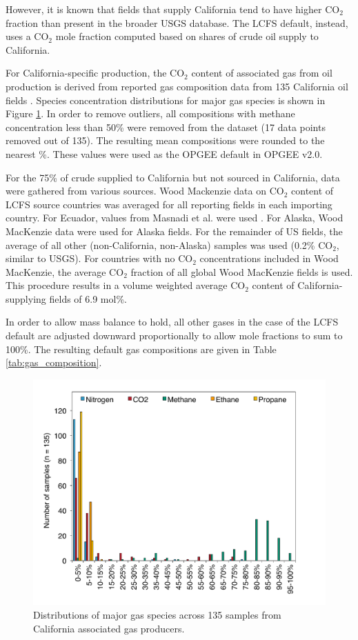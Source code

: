 \documentclass[11pt]{report}
\begin{document}
However, it is known that fields that supply California tend to have higher CO$_2$ fraction than present in the broader USGS database. The LCFS default, instead, uses a CO$_2$ mole fraction computed based on shares of crude oil supply to California. 

For California-specific production, the CO$_2$ content of associated gas from oil production is derived from reported gas composition data from 135 California oil fields \cite{Lee2011}. Species concentration distributions for major gas species is shown in Figure \ref{fig:gas_comp_major}. In order to remove outliers, all compositions with methane concentration less than 50\% were removed from the dataset (17 data points removed out of 135). The resulting mean compositions were rounded to the nearest \%. These values were used as the OPGEE default in OPGEE v2.0.

For the 75\% of crude supplied to California but not sourced in California, data were gathered from various sources. Wood Mackenzie data on CO$_2$ content of LCFS source countries was averaged for all reporting fields in each importing country.  For Ecuador, values from Masnadi et al. were used \cite{Masnadi2018}. For Alaska, Wood MacKenzie data were used for Alaska fields. For the remainder of US fields, the average of all other (non-California, non-Alaska) samples was used (0.2\% CO$_2$, similar to USGS). For countries with no CO$_2$ concentrations included in Wood MacKenzie, the average CO$_2$ fraction of all global Wood MacKenzie fields is used. This procedure results in a volume weighted average CO$_2$ content of California-supplying fields of 6.9 mol\%.

In order to allow mass balance to hold, all other gases in the case of the LCFS default are adjusted downward proportionally to allow mole fractions to sum to 100\%. The resulting default gas compositions are given in Table \ref{tab:gas_composition}.


\begin{figure}
\includegraphics[width=0.8\columnwidth]{images/gas_comp_major.pdf}
\caption{Distributions of major gas species across 135 samples from California associated gas producers.}
\label{fig:gas_comp_major}
\end{figure}
\end{document}
